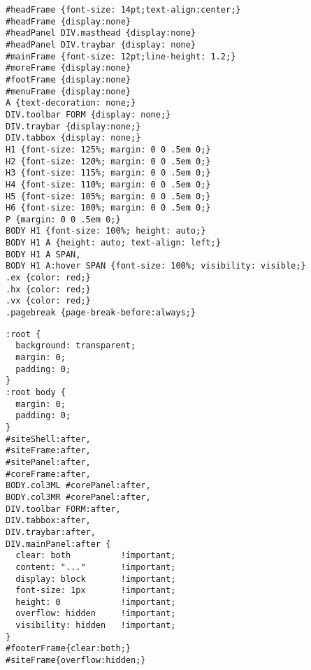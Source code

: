 \documentclass[12pt,a4paper,twosides,ngerman]{scrbook}
\begin{document}
 
\newpage 


\begin{center}
\begin{minipage}[t]{155mm}
\begin{lstlisting}[captionpos=b, caption=CSS File print-mod-test.css] 
#headFrame {font-size: 14pt;text-align:center;}
#headFrame {display:none}
#headPanel DIV.masthead {display:none}
#headPanel DIV.traybar {display: none} 
#mainFrame {font-size: 12pt;line-height: 1.2;}
#moreFrame {display:none}
#footFrame {display:none}
#menuFrame {display:none}
A {text-decoration: none;}
DIV.toolbar FORM {display: none;}
DIV.traybar {display:none;} 
DIV.tabbox {display: none;}
H1 {font-size: 125%; margin: 0 0 .5em 0;}
H2 {font-size: 120%; margin: 0 0 .5em 0;}
H3 {font-size: 115%; margin: 0 0 .5em 0;}
H4 {font-size: 110%; margin: 0 0 .5em 0;}
H5 {font-size: 105%; margin: 0 0 .5em 0;}
H6 {font-size: 100%; margin: 0 0 .5em 0;}
P {margin: 0 0 .5em 0;}
BODY H1 {font-size: 100%; height: auto;}
BODY H1 A {height: auto; text-align: left;}
BODY H1 A SPAN, 
BODY H1 A:hover SPAN {font-size: 100%; visibility: visible;}
.ex {color: red;}
.hx {color: red;}
.vx {color: red;}
.pagebreak {page-break-before:always;}
\end{lstlisting}
\end{minipage}
\end{center}   

\newpage 

\begin{center}
\begin{minipage}[t]{155mm}
\begin{lstlisting}[captionpos=b, caption=CSS File nonIE.css] 
:root {
  background: transparent;
  margin: 0;
  padding: 0;
}
:root body {
  margin: 0;
  padding: 0;
}
#siteShell:after,
#siteFrame:after,
#sitePanel:after,
#coreFrame:after,
BODY.col3ML #corePanel:after,
BODY.col3MR #corePanel:after,
DIV.toolbar FORM:after,
DIV.tabbox:after,
DIV.traybar:after,
DIV.mainPanel:after {
  clear: both          !important;
  content: "..."       !important;
  display: block       !important;
  font-size: 1px       !important;
  height: 0            !important;
  overflow: hidden     !important;
  visibility: hidden   !important;
}
#footerFrame{clear:both;}
#siteFrame{overflow:hidden;}
\end{lstlisting}
\end{minipage}
\end{center}   

\listoffigures


\listoftables


 
 
\lstlistoflistings  
 
 
\end{document}
